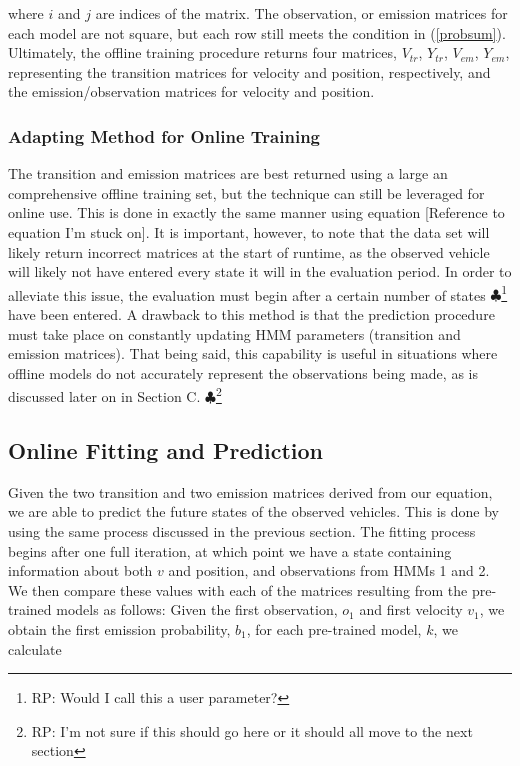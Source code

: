 \documentclass[conference]{IEEEtran}
\newcommand\RP[1]{$\clubsuit$\footnote{RP: #1}}
\begin{document}
where $i$ and $j$ are indices of the matrix. The observation, or emission matrices for each model are not square, but each row still meets the condition in (\ref{probsum}). Ultimately, the offline training procedure returns four matrices, $V_{tr}$, $Y_{tr}$, $V_{em}$, $Y_{em}$, representing the transition matrices for velocity and position, respectively, and the emission/observation matrices for velocity and position.



\subsubsection{Adapting Method for Online Training}
The transition and emission matrices are best returned using a large an comprehensive offline training set, but the technique can still be leveraged for online use. This is done in exactly the same manner using equation [Reference to equation I'm stuck on]. It is important, however, to note that the data set will likely return incorrect matrices at the start of runtime, as the observed vehicle will likely not have entered every state it will in the evaluation period. In order to alleviate this issue, the evaluation must begin after a certain number of states \RP{Would I call this a user parameter?} have been entered. A drawback to this method is that the prediction procedure must take place on constantly updating HMM parameters (transition and emission matrices). That being said, this capability is useful in situations where offline models do not accurately represent the observations being made, as is discussed later on in Section C. \RP{I'm not sure if this should go here or it should all move to the next section}

\subsection{Online Fitting and Prediction}
Given the two transition and two emission matrices derived from our equation, we are able to predict the future states of the observed vehicles. This is done by using the same process discussed in the previous section. The fitting process begins after one full iteration, at which point we have a state containing information about both $v$ and position, and observations from HMMs 1 and 2. We then compare these values with each of the matrices resulting from the pre-trained models as follows: Given the first observation, $o_{1}$ and first velocity $v_{1}$, we obtain the first emission probability, $b_{1}$, for each pre-trained model, $k$, we calculate
\end{document}
